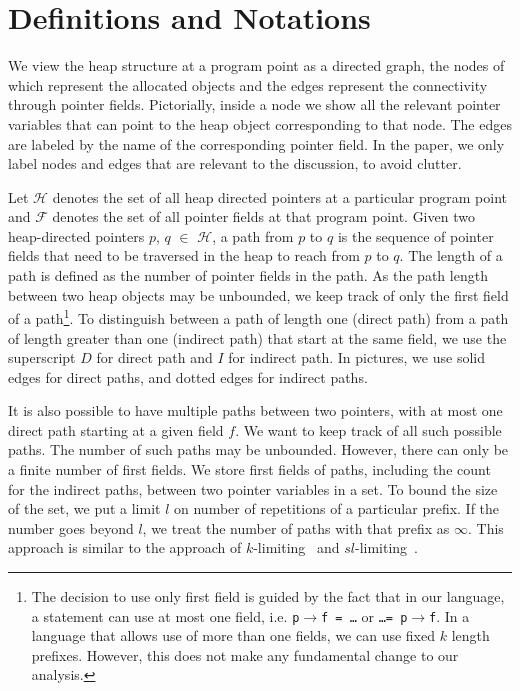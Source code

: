 \documentclass[runningheads,a4paper]{llncs}
\newcommand{\p}{\ensuremath{p}}
\newcommand{\q}{\ensuremath{q}}
\newcommand{\drct}{\ensuremath{D}}
\newcommand{\indrct}{\ensuremath{I}}
\newcommand{\heap}{\ensuremath{\mathcal{H}}}
\newcommand{\fields}{\ensuremath{\mathcal{F}}}
\begin{document}
\section{Definitions and Notations} \label{sec:Formal_Definitions}

We view the heap structure at a program point as a directed
graph, the nodes of which represent the allocated objects and
the edges represent the connectivity through pointer fields.
Pictorially, inside a node we show all the relevant
pointer variables that can point to the heap object
corresponding to that node. The edges are labeled by the name
of the corresponding pointer field. In the paper, we only
label nodes and edges that are relevant to the discussion, to
avoid clutter.

Let $\heap$ denotes the set of all heap directed
pointers at a particular program point and $\fields$
denotes the set of all pointer fields at that program point.
Given two heap-directed pointers $\p$, $\q$ $\in$
$\heap$, a path from $\p$ to $\q$ is the sequence
of pointer fields that need to be traversed in the heap to
reach from $\p$ to $\q$.  The length of a path is
defined as the number of pointer fields in the path.  As the
path length between two heap objects may be unbounded, we
keep track of only the first field of a path\footnote{The
  decision to use only first field is guided by the fact that
  in our language, a statement can use at most one field,
  i.e. {\tt p$\rightarrow$f = \ldots} or {\tt \ldots = p$\rightarrow$f}. In a
  language that allows use of more than one fields, we can
  use fixed $k$ length prefixes. However, this does not make
  any fundamental change to our analysis.}. To distinguish 
between a path of length one (direct path)
from a path of length greater than one (indirect path) that
start at the same field, we use the superscript $\drct$ for
direct path and $\indrct$ for indirect path. In pictures, we
use solid edges for direct paths, and dotted edges for
indirect paths.

It is also possible to have multiple paths between two
pointers, with at most one direct path starting at a given
field $f$. We want to keep track of all such possible
paths. The number of such paths may be unbounded. However,
there can only be a finite number of first fields. We store
first fields of paths, including the count for the indirect
paths, between two pointer variables in a set. To bound the
size of the set, we put a limit $l$ on number of repetitions
of a particular prefix. If the number goes beyond $l$, we
treat the number of paths with that prefix as $\infty$. This
approach is similar to the approach of
$k$-limiting~\cite{Jones79} and
$sl$-limiting~\cite{Larus88}.
\end{document}
